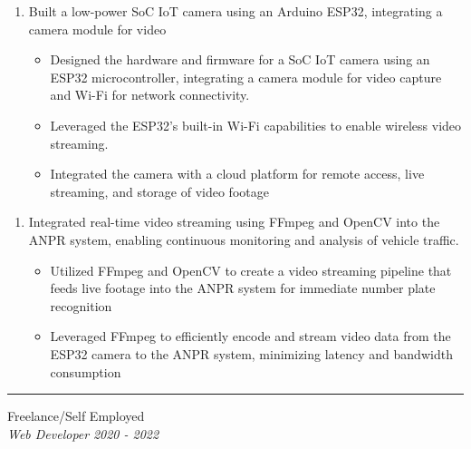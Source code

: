 \documentclass{article}
\begin{document}
\begin{enumerate}
    \item[] Built a low-power SoC IoT camera using an Arduino ESP32, integrating a camera module for video
   \begin{itemize}
    \item Designed the hardware and firmware for a SoC IoT camera using an ESP32 microcontroller, integrating a camera module for video capture and Wi-Fi for network connectivity.
    \item Leveraged the ESP32's built-in Wi-Fi capabilities to enable wireless video streaming. 
    \item Integrated the camera with a cloud platform for remote access, live streaming, and storage of video footage
   \end{itemize}
\end{enumerate}



\begin{enumerate}
    \item[] Integrated real-time video streaming using FFmpeg and OpenCV into the ANPR system, enabling continuous monitoring and analysis of vehicle traffic.
   \begin{itemize}
    \item Utilized FFmpeg and OpenCV to create a video streaming pipeline that feeds live footage into the ANPR system for immediate number plate recognition
    \item Leveraged FFmpeg to efficiently encode and stream video data from the ESP32 camera to the ANPR system, minimizing latency and bandwidth consumption
   \end{itemize}
\end{enumerate}




\vspace{1.4em}
\hrule 
\vspace{0.4em}
\hspace{-2.em}
{\bf}Freelance/Self Employed  \hfill {} \\%
{\em Web Developer } \hfill {\em 2020 - 2022 } %
\subsection*{}
\vspace{-2.6em}
\end{document}
